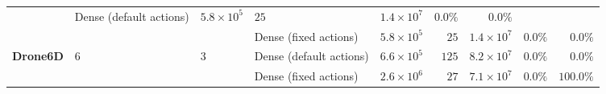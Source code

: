 \begin{tabular}{llll rrr rr}
 & Dense (default actions) & $5.8 \times 10^{5}$ & $25$ & $1.4 \times 10^{7}$ & $0.0\%$ & $0.0\%$ \\
 & & & Dense (fixed actions) & $5.8 \times 10^{5}$ & $25$ & $1.4 \times 10^{7}$ & $0.0\%$ & $0.0\%$ \\
\midrule
\multirow{2}{*}{\textbf{Drone6D}} & \multirow{2}{*}{6} & \multirow{2}{*}{3}
 & Dense (default actions) & $6.6 \times 10^{5}$ & $125$ & $8.2 \times 10^{7}$ & $0.0\%$ & $0.0\%$ \\
 & & & Dense (fixed actions) & $2.6 \times 10^{6}$ & $27$ & $7.1 \times 10^{7}$ & $0.0\%$ & $100.0\%$ \\
\bottomrule
\end{tabular}%
